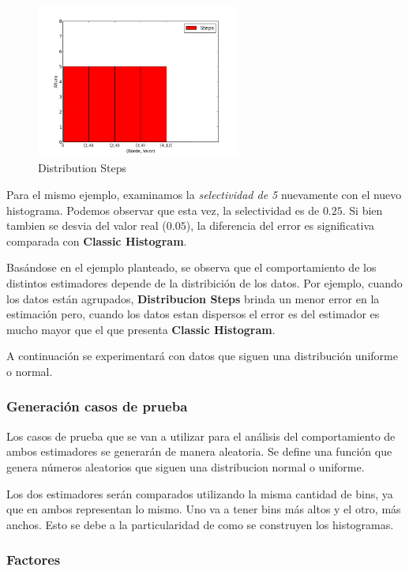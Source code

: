 \documentclass[10pt, a4paper,english,spanish,hidelinks]{article}
\begin{document}
\begin{figure}[h!]
  \centering
  \includegraphics[width=0.6\textwidth]{./imagenes/ejb1_ejemplo_steps.png}
  \caption{Distribution Steps}
\end{figure}


Para el mismo ejemplo, examinamos la \textit{selectividad de 5} nuevamente con el nuevo histograma.
Podemos observar que esta vez, la selectividad es de $0.25$. Si bien tambien se desvia del valor real ($0.05$),
la diferencia del error es significativa comparada con \textbf{Classic Histogram}.


Basándose en el ejemplo planteado, se observa que el comportamiento de los distintos estimadores
depende de la distribición de los datos.
Por ejemplo, cuando los datos están agrupados, \textbf{Distribucion Steps} brinda un menor
error en la estimación pero, cuando los datos estan dispersos el error es del estimador es
mucho mayor que el que presenta \textbf{Classic Histogram}.

A continuación se experimentará con datos que siguen una distribución uniforme o normal.

\subsubsection{Generación casos de prueba}
Los casos de prueba que se van a utilizar para el análisis del comportamiento de ambos estimadores se generarán de manera aleatoria. Se define una función que genera números aleatorios que siguen una distribucion normal o uniforme.

Los dos estimadores serán comparados utilizando la misma cantidad de bins, ya que en ambos representan lo mismo. Uno va a tener bins más altos y el otro, más anchos. Esto se debe a la particularidad de como se construyen los histogramas.

\subsubsection{Factores}
\end{document}

